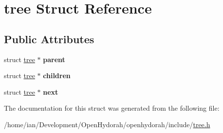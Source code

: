 \hypertarget{structtree}{\section{tree Struct Reference}
\label{structtree}
}
\subsection*{Public Attributes}
\begin{DoxyCompactItemize}
\item 
\hypertarget{structtree_ad006c8efc0f6580abbff98d685489dc5}{struct \hyperlink{structtree}{tree} $\ast$ {\bfseries parent}}\label{structtree_ad006c8efc0f6580abbff98d685489dc5}

\item 
\hypertarget{structtree_a3d696acca71e630b72bc38b56998c926}{struct \hyperlink{structtree}{tree} $\ast$ {\bfseries children}}\label{structtree_a3d696acca71e630b72bc38b56998c926}

\item 
\hypertarget{structtree_a9949fa61ffea1eb19f913be9d1d126c4}{struct \hyperlink{structtree}{tree} $\ast$ {\bfseries next}}\label{structtree_a9949fa61ffea1eb19f913be9d1d126c4}

\end{DoxyCompactItemize}


The documentation for this struct was generated from the following file\-:\begin{DoxyCompactItemize}
\item 
/home/ian/\-Development/\-Open\-Hydorah/openhydorah/include/\hyperlink{tree_8h}{tree.\-h}\end{DoxyCompactItemize}
